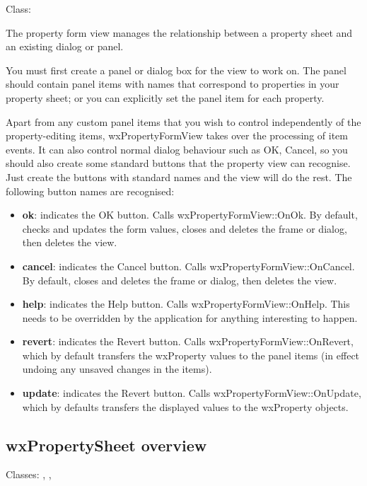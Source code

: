 Class: 

The property form view manages the relationship between a property sheet
and an existing dialog or panel.

You must first create a panel or dialog box for the view to work on.
The panel should contain panel items with names that correspond to
properties in your property sheet; or you can explicitly set the
panel item for each property.

Apart from any custom panel items that you wish to control independently
of the property-editing items, wxPropertyFormView takes over the
processing of item events. It can also control normal dialog behaviour such
as OK, Cancel, so you should also create some standard buttons that the property view
can recognise. Just create the buttons with standard names and the view
will do the rest. The following button names are recognised:

\begin{itemize}\itemsep=0pt
\item {\bf ok}: indicates the OK button. Calls wxPropertyFormView::OnOk. By default,
checks and updates the form values, closes and deletes the frame or dialog, then deletes the view.
\item {\bf cancel}: indicates the Cancel button. Calls wxPropertyFormView::OnCancel. By default,
closes and deletes the frame or dialog, then deletes the view.
\item {\bf help}: indicates the Help button. Calls wxPropertyFormView::OnHelp. This needs
to be overridden by the application for anything interesting to happen.
\item {\bf revert}: indicates the Revert button. Calls wxPropertyFormView::OnRevert,
which by default transfers the wxProperty values to the panel items (in effect
undoing any unsaved changes in the items).
\item {\bf update}: indicates the Revert button. Calls wxPropertyFormView::OnUpdate, which
by defaults transfers the displayed values to the wxProperty objects.
\end{itemize}

\subsection{wxPropertySheet overview}\label{wxpropertysheetoverview}

Classes: , , 

